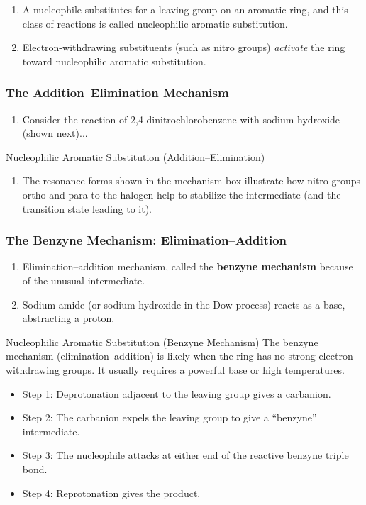 \begin{enumerate}
    \item A nucleophile substitutes for a leaving group on an aromatic ring, and this class of reactions is called nucleophilic aromatic substitution.
    \item Electron-withdrawing substituents (such as nitro groups) \textit{activate} the ring toward nucleophilic aromatic substitution.
\end{enumerate}

\subsubsection{The Addition–Elimination Mechanism}

\begin{enumerate}
    \item Consider the reaction of 2,4-dinitrochlorobenzene with sodium hydroxide (shown next)...
\end{enumerate}

\begin{mechanism}
    Nucleophilic Aromatic Substitution (Addition–Elimination)
\end{mechanism}

\begin{enumerate}[resume]
    \item The resonance forms shown in the mechanism box illustrate how nitro groups ortho and para to the halogen help to stabilize the intermediate (and the transition state leading to it).
\end{enumerate}

\subsubsection{The Benzyne Mechanism: Elimination–Addition}

\begin{enumerate}
    \item Elimination–addition mechanism, called the \textbf{benzyne mechanism} because of the unusual intermediate.
    \item Sodium amide (or sodium hydroxide in the Dow process) reacts as a base, abstracting a proton.
\end{enumerate}

\begin{mechanism}
    Nucleophilic Aromatic Substitution (Benzyne Mechanism)
    The benzyne mechanism (elimination–addition) is likely when the ring has no strong electron-withdrawing groups. It usually requires a powerful base or high temperatures.
    \begin{itemize}
        \item Step 1: Deprotonation adjacent to the leaving group gives a carbanion.
        \item Step 2: The carbanion expels the leaving group to give a “benzyne” intermediate.
        \item Step 3: The nucleophile attacks at either end of the reactive benzyne triple bond.
        \item Step 4: Reprotonation gives the product.
    \end{itemize}
\end{mechanism}

